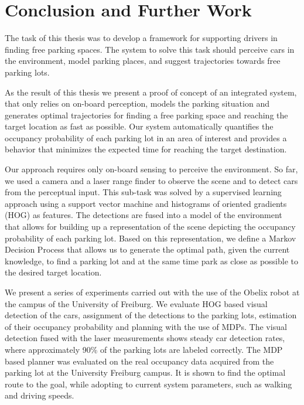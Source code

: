 
\chapter{Conclusion and Further Work} %
\label{cha:conclusion_and_further_work}

    The task of this thesis was to develop a framework for supporting drivers
    in finding free parking spaces. The system to solve this task should
    perceive cars in the environment, model parking places, and suggest
    trajectories towards free parking lots.

    As the result of this thesis we present a proof of concept of an
    integrated system, that only relies on on-board perception, models the
    parking situation and generates optimal trajectories for finding a free
    parking space and reaching the target location as fast as possible. Our
    system automatically quantifies the occupancy probability of each parking
    lot in an area of interest and provides a behavior that minimizes the
    expected time for reaching the target destination.

    Our approach requires only on-board sensing to perceive the environment.
    So far, we used a camera and a laser range finder to observe the scene and
    to detect cars from the perceptual input. This sub-task was solved by a
    supervised learning approach using a support vector machine and histograms
    of oriented gradients (HOG) as features. The detections are fused into a
    model of the environment that allows for building up a representation of
    the scene depicting the occupancy probability of each parking lot. Based
    on this representation, we define a Markov Decision Process that allows us
    to generate the optimal path, given the current knowledge, to find a
    parking lot and at the same time park as close as possible to the desired
    target location.

    We present a series of experiments carried out with the use of the Obelix
    robot at the campus of the University of Freiburg. We evaluate HOG based
    visual detection of the cars, assignment of the detections to the parking
    lots, estimation of their occupancy probability and planning with the use
    of MDPs. The visual detection fused with the laser measurements shows
    steady car detection rates, where approximately 90\% of the parking lots
    are labeled correctly. The MDP based planner was evaluated on the real
    occupancy data acquired from the parking lot at the University Freiburg
    campus. It is shown to find the optimal route to the goal, while adopting
    to current system parameters, such as walking and driving speeds.

